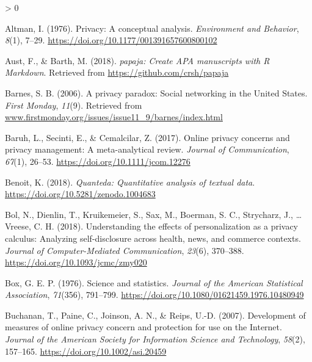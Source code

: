 \documentclass[
  english,
  man,floatsintext]{apa6}
\newlength{\cslhangindent}
\newenvironment{CSLReferences}[2] %
 {%
  \setlength{\parindent}{0pt}
  \ifodd #1 \everypar{\setlength{\hangindent}{\cslhangindent}}\ignorespaces\fi
  \ifnum #2 > 0
  \setlength{\parskip}{#2\baselineskip}
  \fi
 }%
 {}
\begin{document}
\setlength{\parindent}{-0.5in}
\setlength{\leftskip}{0.5in}

\hypertarget{refs}{}
\begin{CSLReferences}{1}{0}
\leavevmode\hypertarget{ref-altmanPrivacyConceptualAnalysis1976}{}%
Altman, I. (1976). Privacy: {A} conceptual analysis. \emph{Environment and Behavior}, \emph{8}(1), 7--29. \url{https://doi.org/10.1177/001391657600800102}

\leavevmode\hypertarget{ref-R-papaja}{}%
Aust, F., \& Barth, M. (2018). \emph{{papaja}: {Create} {APA} manuscripts with {R Markdown}}. Retrieved from \url{https://github.com/crsh/papaja}

\leavevmode\hypertarget{ref-barnesPrivacyParadoxSocial2006}{}%
Barnes, S. B. (2006). A privacy paradox: {Social} networking in the {United} {States}. \emph{First Monday}, \emph{11}(9). Retrieved from \href{https://www.firstmonday.org/issues/issue11_9/barnes/index.html}{www.firstmonday.org/issues/issue11\_9/barnes/index.html}

\leavevmode\hypertarget{ref-baruhOnlinePrivacyConcerns2017}{}%
Baruh, L., Secinti, E., \& Cemalcilar, Z. (2017). Online privacy concerns and privacy management: {A} meta-analytical review. \emph{Journal of Communication}, \emph{67}(1), 26--53. \url{https://doi.org/10.1111/jcom.12276}

\leavevmode\hypertarget{ref-R-quanteda}{}%
Benoit, K. (2018). \emph{Quanteda: Quantitative analysis of textual data}. \url{https://doi.org/10.5281/zenodo.1004683}

\leavevmode\hypertarget{ref-bolUnderstandingEffectsPersonalization2018}{}%
Bol, N., Dienlin, T., Kruikemeier, S., Sax, M., Boerman, S. C., Strycharz, J., \ldots{} Vreese, C. H. (2018). Understanding the effects of personalization as a privacy calculus: {Analyzing} self-disclosure across health, news, and commerce contexts. \emph{Journal of Computer-Mediated Communication}, \emph{23}(6), 370--388. \url{https://doi.org/10.1093/jcmc/zmy020}

\leavevmode\hypertarget{ref-boxScienceStatistics1976}{}%
Box, G. E. P. (1976). Science and statistics. \emph{Journal of the American Statistical Association}, \emph{71}(356), 791--799. \url{https://doi.org/10.1080/01621459.1976.10480949}

\leavevmode\hypertarget{ref-buchananDevelopmentMeasuresOnline2007}{}%
Buchanan, T., Paine, C., Joinson, A. N., \& Reips, U.-D. (2007). Development of measures of online privacy concern and protection for use on the {Internet}. \emph{Journal of the American Society for Information Science and Technology}, \emph{58}(2), 157--165. \url{https://doi.org/10.1002/asi.20459}


\end{CSLReferences}
\end{document}
